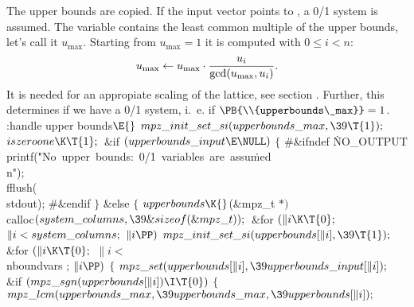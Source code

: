 The upper bounds are copied. If the input vector points to \PB{$\NULL$},
a
0/1 system is assumed. The variable
 contains the least common multiple
of the upper bounds, let's call it $u_{\max}$.
Starting from $u_{\max}=1$
it is computed with $0\le i<n$:
$$
u_{\max} \leftarrow u_{\max}\cdot {u_i\over \gcd(u_{\max},u_i)}.
$$
It is needed for an
appropiate scaling of the lattice, see section .
Further, this determines if we have a 0/1 system, i.~e. if
$\PB{\\{upperbounds\_max}}=1$.
\Y\B\4:handle upper bounds\X${}\E{}$\6
$\\{mpz\_init\_set\_si}(\\{upperbounds\_max},\39\T{1});{}$\6
${}\\{iszeroone}\K\T{1};{}$\6
\&{if} ${}(\\{upperbounds\_input}\E\NULL){}$\5
${}\{{}$\6
\8\#\&{ifndef} \.{NO\_OUTPUT}\1\6
\\{printf}(\.{"No\ upper\ bounds:\ 0/}\)\.{1\ variables\ are\ assu}\)\.{med\ %
\\n"});\5
\\{fflush}(\\{stdout});\6
\8\#\&{endif}\6
\4${}\}{}$\2\6
\&{else}\5
${}\{{}$\1\6
${}\\{upperbounds}\K{}$(\&{mpz\_t} ${}{*}){}$ \\{calloc}${}(\\{system%
\_columns},\39\&{sizeof}(\&{mpz\_t}));{}$\6
\&{for} ${}(\|i\K\T{0};{}$ ${}\|i<\\{system\_columns};{}$ ${}\|i\PP){}$\1\5
${}\\{mpz\_init\_set\_si}(\\{upperbounds}[\|i],\39\T{1});{}$\2\6
\&{for} ${}(\|i\K\T{0};{}$ ${}\|i<{}$\\{nboundvars}%
\6
; ${}\|i\PP){}$\5
${}\{{}$\1\6
${}\\{mpz\_set}(\\{upperbounds}[\|i],\39\\{upperbounds\_input}[\|i]);{}$\6
\&{if} ${}(\\{mpz\_sgn}(\\{upperbounds}[\|i])\I\T{0}){}$\5
${}\{{}$\1\6
${}\\{mpz\_lcm}(\\{upperbounds\_max},\39\\{upperbounds\_max},\39%
\\{upperbounds}[\|i]);{}$\6
